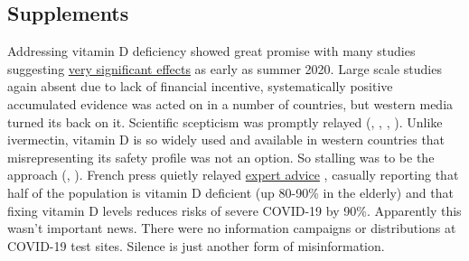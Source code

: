 \documentclass[11pt,a4paper,notitlepage]{report}
\begin{document}

\subsection*{Supplements}

Addressing vitamin D deficiency showed great promise with many studies suggesting \href{https://c19vitamind.com/}{very significant effects} as early as summer 2020. Large scale studies again absent due to lack of financial incentive, systematically positive accumulated evidence was acted on in a number of countries, but western media turned its back on it. Scientific scepticism was promptly relayed (\cite{guardian29062020}, \cite{guardian29032021}, \cite{bbc17112020}, \cite{quechoisir29012021}). Unlike ivermectin, vitamin D is so widely used and available in western countries that misrepresenting its safety profile was not an option. So stalling was to be the approach (\cite{bbc05042021}, \cite{guardian29022021}). French press quietly relayed \href{https://www.franceinter.fr/covid-19-73-experts-lancent-un-appel-pour-qu-on-donne-de-la-vitamine-d-a-la-population-francaise}{expert advice} \cite{franceinter19012021}, casually reporting that half of the population is vitamin D deficient (up 80-90\% in the elderly) and that fixing vitamin D levels reduces risks of severe COVID-19 by 90\%. Apparently this wasn't important news. There were no information campaigns or distributions at COVID-19 test sites. Silence is just another form of misinformation.
\end{document}

